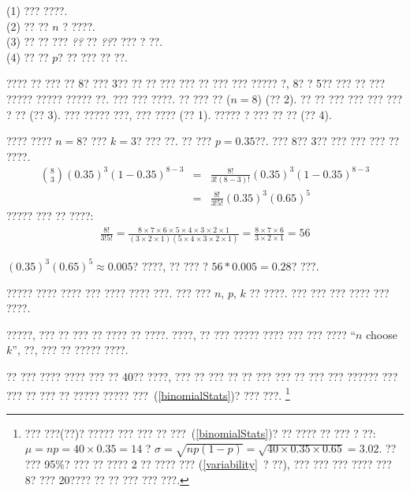 \begin{tipBox}{
(1) ??? ????. \\
(2) ?? ?? $n$ ? ????. \\
(3) ?? ?? ??? \emph{??} ?? \emph{??}? ??? ? ??. \\
(4) ?? ?? $p$? ?? ??? ?? ??.}
\end{tipBox}

\begin{example}{???? ?? ??? ?? 8? ??? 3?? ?? ?? ??? ??? ?? ??? ??? ????? ?, 8? ? 5?? ??? ?? ??? ?????}
????? ????? ??. ??? ??? ????. ?? ??? ?? ($n=8$) (?? 2). ?? ?? ??? ??? ??? ??? ? ?? (?? 3). ??? ????? ???, ??? ???? (?? 1). ????? ? ??? ?? ?? (?? 4).

???? ???? $n=8$? ??? $k=3$? ??? ??. ?? ??? $p=0.35$??. ??? 8?? 3?? ??? ??? ??? ?? ????.
\begin{eqnarray*}
{ 8 \choose 3}(0.35)^3(1-0.35)^{8-3}
	&=& \frac{8!}{3!(8-3)!}(0.35)^3(1-0.35)^{8-3} \\
	&=& \frac{8!}{3!5!}(0.35)^3(0.65)^5
\end{eqnarray*}
????? ??? ?? ????:
\begin{eqnarray*}
\frac{8!}{3!5!} = \frac{8\times7\times6\times5\times4\times3\times2\times1}{(3\times2\times1)(5\times4\times3\times2\times1)} = \frac{8\times7\times6}{3\times2\times1} = 56
\end{eqnarray*}

$(0.35)^3(0.65)^5 \approx 0.005$? ????, ?? ??? ? $56*0.005 = 0.28$? ???.
\end{example}

\begin{tipBox}{
????? ???? ???? ??? ???? ???? ???. ??? ??? $n$, $p$, $k$ ?? ????. ??? ??? ??? ???? ??? ????.}
\end{tipBox}

\begin{tipBox}{
?????, ??? ?? ??? ?? ???? ?? ????. ????, ?? ??? ????? ???? ??? ??? ???? ``$n$ choose $k$'', ??, ??? ?? ????? ????.}
\end{tipBox}

\begin{exercise}
?? ??? ???? ???? ??? ?? 40?? ????, ??? ?? ??? ?? ?? ??? ??? ?? ??? ??? ?????? ??? ??? ?? ??? ?? ????? ????? ???~(\ref{binomialStats})? ??? ???. 
\footnote{??? ???(??)? ????? ??? ??? ?? ???~(\ref{binomialStats})? ?? ???? ?? ??? ? ??: $\mu=np = 40\times 0.35 = 14$ ? $\sigma = \sqrt{np(1-p)} = \sqrt{40\times 0.35\times 0.65} = 3.02$. 
?? ??? 95\%? ??? ?? ???? 2 ?? ???? ??? (\ref{variability}~? ??), ??? ??? ??? ???? ??? 8? ??? 20???? ?? ?? ??? ??? ???.}
\end{exercise}

